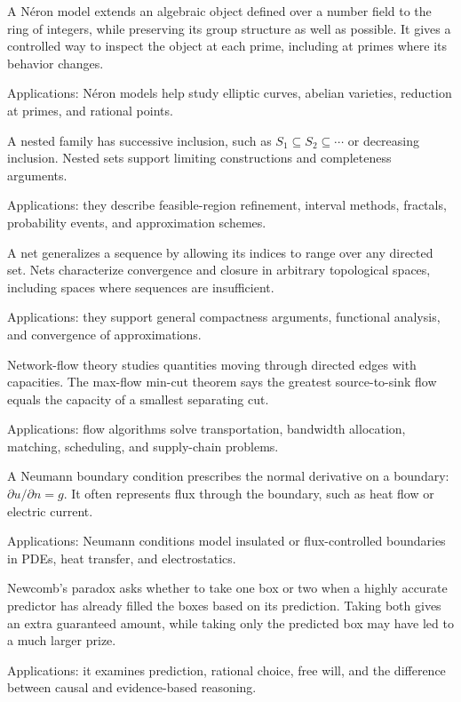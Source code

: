 A Néron model extends an algebraic object defined over a number field to the ring of integers, while preserving its group structure as well as possible. It gives a controlled way to inspect the object at each prime, including at primes where its behavior changes. \par\noindent Applications: Néron models help study elliptic curves, abelian varieties, reduction at primes, and rational points.

A nested family has successive inclusion, such as $S_1\subseteq S_2\subseteq\cdots$ or decreasing inclusion. Nested sets support limiting constructions and completeness arguments. \par\noindent Applications: they describe feasible-region refinement, interval methods, fractals, probability events, and approximation schemes.

A net generalizes a sequence by allowing its indices to range over any directed set. Nets characterize convergence and closure in arbitrary topological spaces, including spaces where sequences are insufficient. \par\noindent Applications: they support general compactness arguments, functional analysis, and convergence of approximations.

Network-flow theory studies quantities moving through directed edges with capacities. The max-flow min-cut theorem says the greatest source-to-sink flow equals the capacity of a smallest separating cut. \par\noindent Applications: flow algorithms solve transportation, bandwidth allocation, matching, scheduling, and supply-chain problems.

A Neumann boundary condition prescribes the normal derivative on a boundary: $\partial u/\partial n=g$. It often represents flux through the boundary, such as heat flow or electric current. \par\noindent Applications: Neumann conditions model insulated or flux-controlled boundaries in PDEs, heat transfer, and electrostatics.

Newcomb's paradox asks whether to take one box or two when a highly accurate predictor has already filled the boxes based on its prediction. Taking both gives an extra guaranteed amount, while taking only the predicted box may have led to a much larger prize. \par\noindent Applications: it examines prediction, rational choice, free will, and the difference between causal and evidence-based reasoning.


